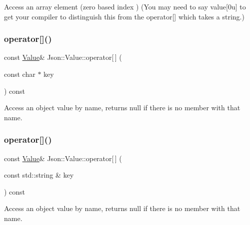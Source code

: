 Access an array element (zero based index ) (You may need to say \textquotesingle{}value\mbox{[}0u\mbox{]}\textquotesingle{} to get your compiler to distinguish this from the operator\mbox{[}\mbox{]} which takes a string.) \mbox{\label{class_json_1_1_value_a902b8d7b0bbb7a671ea0a5e3a8e936a3}} 
\subsubsection{\texorpdfstring{operator[]()}{operator[]()}\hspace{0.1cm}{\footnotesize\ttfamily [5/7]}}
{\footnotesize\ttfamily const \mbox{\hyperlink{class_json_1_1_value}{Value}}\& Json\+::\+Value\+::operator\mbox{[}$\,$\mbox{]} (\begin{DoxyParamCaption}\item[{const char $\ast$}]{key }\end{DoxyParamCaption}) const}

Access an object value by name, returns null if there is no member with that name. \mbox{\label{class_json_1_1_value_a25b2560baf8dd9fd15b120a7f12b0892}} 
\subsubsection{\texorpdfstring{operator[]()}{operator[]()}\hspace{0.1cm}{\footnotesize\ttfamily [6/7]}}
{\footnotesize\ttfamily const \mbox{\hyperlink{class_json_1_1_value}{Value}}\& Json\+::\+Value\+::operator\mbox{[}$\,$\mbox{]} (\begin{DoxyParamCaption}\item[{const std\+::string \&}]{key }\end{DoxyParamCaption}) const}

Access an object value by name, returns null if there is no member with that name. \mbox{\label{class_json_1_1_value_ac191343a7ee2ca54827d67d934200d4f}} 
